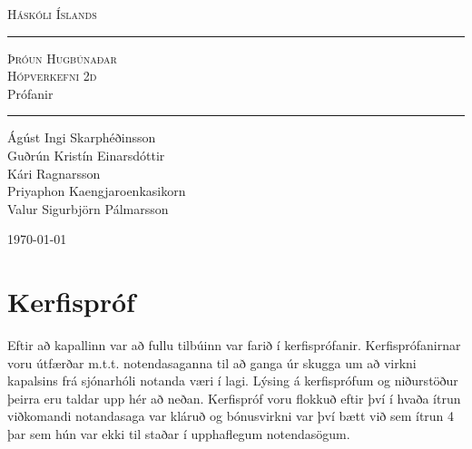 \documentclass[11pt,a4paper,titlepage]{article}
\theoremstyle{plain}
\theoremstyle{remark}
\begin{document}
\begin{center}


\textsc{Háskóli Íslands}
\end{center}
\vspace*{5cm}



\large {\bf
\begin{center}
\noindent\rule{15cm}{0.4pt}
\textsc{Þróun Hugbúnaðar}\\ \textsc{Hópverkefni 2d}\\ Prófanir \\
\noindent\rule{13cm}{0.4pt} \end{center}}
\small
\vspace{5cm}
\begin{center}
Ágúst Ingi Skarphéðinsson\\Guðrún Kristín Einarsdóttir\\Kári Ragnarsson\\Priyaphon Kaengjaroenkasikorn\\ Valur 
Sigurbjörn Pálmarsson
\end{center}
\vspace{5cm}
\begin{center}
\today
\end{center} 

\newpage \normalsize 
\newpage

\section{Kerfispróf}

Eftir að kapallinn var að fullu tilbúinn var farið í kerfisprófanir. Kerfisprófanirnar voru útfærðar m.t.t. notendasaganna til að ganga úr skugga um að virkni kapalsins frá sjónarhóli notanda væri í lagi.  Lýsing á kerfisprófum og niðurstöður þeirra eru taldar upp hér að neðan. Kerfispróf voru flokkuð eftir því í hvaða ítrun viðkomandi notandasaga var kláruð og bónusvirkni var því bætt við sem ítrun 4 þar sem hún var ekki til staðar í upphaflegum notendasögum.
	
\end{document}
